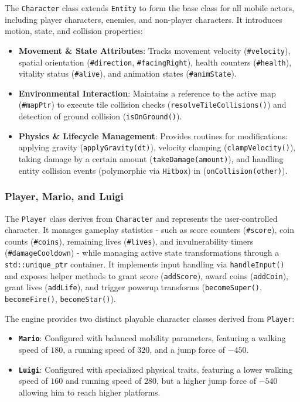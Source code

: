 \documentclass[12pt, a4paper]{article}
\begin{document}
The \texttt{Character} class extends \texttt{Entity} to form the base class for all mobile actors, including player characters, enemies, and non-player characters. It introduces motion, state, and collision properties:
\begin{itemize}
\item \textbf{Movement \& State Attributes}: Tracks movement velocity (\texttt{\#velocity}), spatial orientation (\texttt{\#direction}, \texttt{\#facingRight}), health counters (\texttt{\#health}), vitality status (\texttt{\#alive}), and animation states (\texttt{\#animState}).
\item \textbf{Environmental Interaction}: Maintains a reference to the active map (\texttt{\#mapPtr}) to execute tile collision checks (\texttt{resolveTileCollisions()}) and detection of ground collision (\texttt{isOnGround()}).
\item \textbf{Physics \& Lifecycle Management}: Provides routines for modifications: applying gravity (\texttt{applyGravity(dt)}), velocity clamping (\texttt{clampVelocity()}), taking damage by a certain amount (\texttt{takeDamage(amount)}), and handling entity collision events (polymorphic via \texttt{Hitbox}) in (\texttt{onCollision(other)}).
\end{itemize}

\newpage

\subsubsection{Player, Mario, and Luigi}

The \texttt{Player} class derives from \texttt{Character} and represents the user-controlled character. It manages gameplay statistics - such as score counters (\texttt{\#score}), coin counts (\texttt{\#coins}), remaining lives (\texttt{\#lives}), and invulnerability timers (\texttt{\#damageCooldown}) - while managing active state transformations through a \texttt{std::unique\_ptr} container. It implements input handling via \texttt{handleInput()} and exposes helper methods to grant score (\texttt{addScore}), award coins (\texttt{addCoin}), grant lives (\texttt{addLife}), and trigger powerup transforms (\texttt{becomeSuper()}, \texttt{becomeFire()}, \texttt{becomeStar()}).

The engine provides two distinct playable character classes derived from \texttt{Player}:
\begin{itemize}
\item \textbf{\texttt{Mario}}: Configured with balanced mobility parameters, featuring a walking speed of $180$, a running speed of $320$, and a jump force of $-450$.
\item \textbf{\texttt{Luigi}}: Configured with specialized physical traits, featuring a lower walking speed of $160$ and running speed of $280$, but a higher jump force of $-540$ allowing him to reach higher platforms.
\end{itemize}
\end{document}
